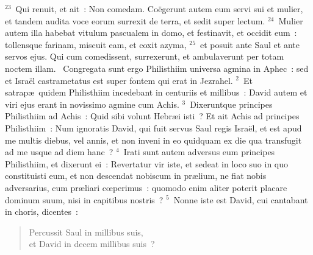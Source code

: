 ${}^{23}$~Qui renuit, et ait~: Non comedam. Co\"egerunt autem eum servi sui et mulier, et tandem audita voce eorum surrexit de terra, et sedit super lectum.
${}^{24}$~Mulier autem illa habebat vitulum pascualem in domo, et festinavit, et occidit eum~: tollensque farinam, miscuit eam, et coxit azyma,
${}^{25}$~et posuit ante Saul et ante servos ejus. Qui cum comedissent, surrexerunt, et ambulaverunt per totam noctem illam.
~Congregata sunt ergo Philisthiim universa agmina in Aphec~: sed et Isra\"el castrametatus est super fontem qui erat in Jezrahel.
${}^{2}$~Et satrap\ae\ quidem Philisthiim incedebant in centuriis et millibus~: David autem et viri ejus erant in novissimo agmine cum Achis.
${}^{3}$~Dixeruntque principes Philisthiim ad Achis~: Quid sibi volunt Hebr\ae i isti~? Et ait Achis ad principes Philisthiim~: Num ignoratis David, qui fuit servus Saul regis Isra\"el, et est apud me multis diebus, vel annis, et non inveni in eo quidquam ex die qua transfugit ad me usque ad diem hanc~?
${}^{4}$~Irati sunt autem adversus eum principes Philisthiim, et dixerunt ei~: Revertatur vir iste, et sedeat in loco suo in quo constituisti eum, et non descendat nobiscum in pr\ae lium, ne fiat nobis adversarius, cum pr\ae liari cœperimus~: quomodo enim aliter poterit placare dominum suum, nisi in capitibus nostris~?
${}^{5}$~Nonne iste est David, cui cantabant in choris, dicentes~: \begin{flushleft}\begin{verse}Percussit Saul in millibus suis,\\ et David in decem millibus suis~?\end{verse}\end{flushleft}


